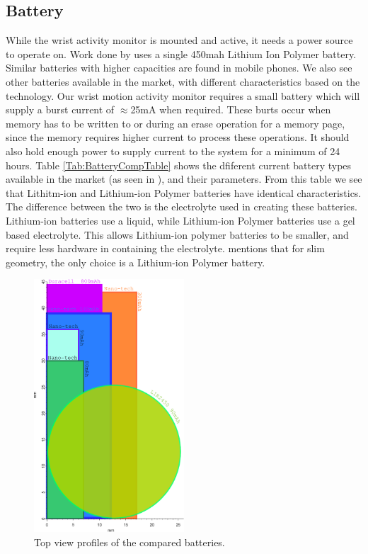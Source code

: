 \subsection{Battery}
\label{Sec:Battery}

While the wrist activity monitor is mounted and active, it needs a power source to operate on.
Work done by \cite{Web:ShimmerHome} uses a single 450mah Lithium Ion Polymer battery.
Similar batteries with higher capacities are found in mobile phones. We also see other batteries available in the market,
with different characteristics based on the technology.
Our wrist motion activity monitor requires a small battery which will supply a burst current of $\approx$25mA when required.
These burts occur when memory has to be written to or during an erase operation for a memory page,
since the memory requires higher current to process these operations.
It should also hold enough power to supply current to the system for a minimum of 24 hours.
Table \ref{Tab:BatteryCompTable} shows the dfiferent current battery types available in the market (as seen in \cite{Web:BatteryTable}), and their parameters. From this table we see that Lithitm-ion and Lithium-ion Polymer batteries have identical characteristics.
The difference between the two is the electrolyte used in creating these batteries.
Lithium-ion batteries use a liquid,
while Lithium-ion Polymer batteries use a gel based electrolyte.
This allows Lithium-ion polymer batteries to be smaller,
and require less hardware in containing the electrolyte.
\cite{Web:BatteryTable} mentions that for slim geometry, the only choice is a Lithium-ion Polymer battery.
\begin{figure}
\begin{center}
\includegraphics[width=0.5\textwidth]{images/battcompare.eps}
\caption{Top view profiles of the compared batteries.}
\label{Fig:BattComp}
\end{center}
\end{figure}
